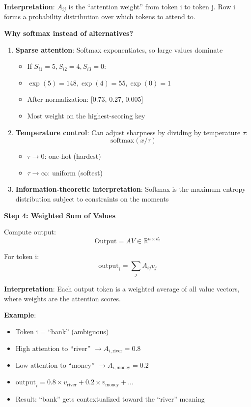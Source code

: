 \documentclass[11pt,oneside]{book}
\begin{document}
\textbf{Interpretation}: $A_{ij}$ is the ``attention weight'' from token i to token j. Row i forms a probability distribution over which tokens to attend to.

\textbf{Why softmax instead of alternatives?}

\begin{enumerate}
\item \textbf{Sparse attention}: Softmax exponentiates, so large values dominate
\begin{itemize}
\item If $S_{i1} = 5, S_{i2} = 4, S_{i3} = 0$:
\item $\exp(5) = 148, \exp(4) = 55, \exp(0) = 1$
\item After normalization: [0.73, 0.27, 0.005]
\item Most weight on the highest-scoring key
\end{itemize}

\item \textbf{Temperature control}: Can adjust sharpness by dividing by temperature $\tau$:
\[
\text{softmax}(x/\tau)
\]
\begin{itemize}
\item $\tau \to 0$: one-hot (hardest)
\item $\tau \to \infty$: uniform (softest)
\end{itemize}

\item \textbf{Information-theoretic interpretation}: Softmax is the maximum entropy distribution subject to constraints on the moments
\end{enumerate}

\textbf{Step 4: Weighted Sum of Values}

Compute output:
\[
\text{Output} = AV \in \mathbb{R}^{n \times d_v}
\]

For token i:
\[
\text{output}_i = \sum_j A_{ij} v_j
\]

\textbf{Interpretation}: Each output token is a weighted average of all value vectors, where weights are the attention scores.

\textbf{Example}:
\begin{itemize}
\item Token i = ``bank'' (ambiguous)
\item High attention to ``river'' $\to A_{i,\text{river}} = 0.8$
\item Low attention to ``money'' $\to A_{i,\text{money}} = 0.2$
\item $\text{output}_i = 0.8 \times v_{\text{river}} + 0.2 \times v_{\text{money}} + ...$
\item Result: ``bank'' gets contextualized toward the ``river'' meaning
\end{itemize}
\end{document}
